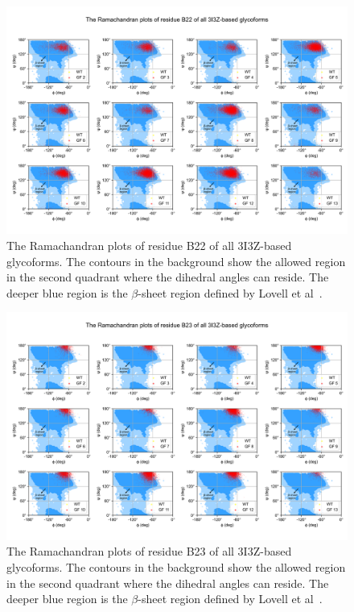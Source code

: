 \documentclass[sn-vancouver]{sn-jnl}
\begin{document}
\renewcommand{\thefigure}{S\arabic{figure}}
\begin{figure}[H]
\centering
\includegraphics[width=\textwidth]{Figures/3I3Z_multi_rama_plot_res_43.png}
\caption{The Ramachandran plots of residue B22 of all 3I3Z-based glycoforms. The contours in the background show the allowed region in the second quadrant where the dihedral angles can reside. The deeper blue region is the $\beta$-sheet region defined by Lovell et al~\cite{lovell2003structure}.}
\end{figure}

\renewcommand{\thefigure}{S\arabic{figure}}
\begin{figure}[H]
\centering
\includegraphics[width=\textwidth]{Figures/3I3Z_multi_rama_plot_res_44.png}
\caption{The Ramachandran plots of residue B23 of all 3I3Z-based glycoforms. The contours in the background show the allowed region in the second quadrant where the dihedral angles can reside. The deeper blue region is the $\beta$-sheet region defined by Lovell et al~\cite{lovell2003structure}.}
\end{figure}
\end{document}
